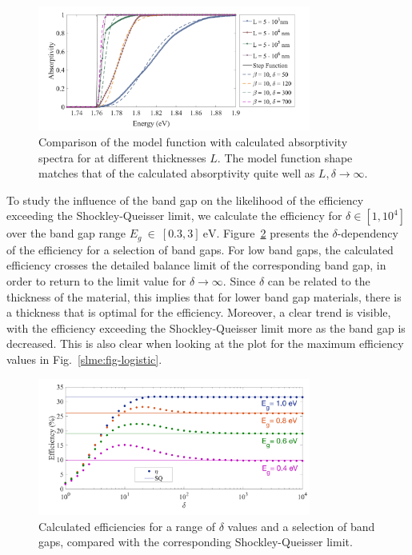 \begin{refsection}
\begin{figure}[ht] 
\centering 
\captionsetup{width=0.9\textwidth}
\includegraphics[width=0.8\textwidth]{Figures/slme/sq_Fig2.png} 
\caption{Comparison of the model function with calculated absorptivity spectra 
for  at different thicknesses $L$. The model function shape 
matches that of the calculated absorptivity quite well as $L,\delta 
\rightarrow \infty$.} 
\label{slme:fig-step} 
\end{figure} 
 
To study the influence of the band gap on the likelihood of the efficiency 
exceeding the Shockley-Queisser limit, we calculate the efficiency for $\delta 
\in [1, 10^4]$ over the band gap range $E_g~\in~[0.3, 3]~\si{\electronvolt}$. 
Figure~\ref{slme:fig-deltadep} presents the $\delta$-dependency of the efficiency for a selection of band gaps. For low band gaps, the 
calculated efficiency crosses the detailed balance limit of the corresponding 
band gap, in order to return to the limit value for $\delta \rightarrow 
\infty$. Since $\delta$ can be related to the thickness of the material, this 
implies that for lower band gap materials, there is a thickness that is 
optimal for the efficiency. Moreover, a clear trend is visible, with the 
efficiency exceeding the Shockley-Queisser limit more as the band gap is 
decreased. This is also clear when looking at the plot for the 
maximum efficiency values in Fig.~\ref{slme:fig-logistic}. 
 
\begin{figure}[ht] 
\centering 
\captionsetup{width=0.9\textwidth}
\includegraphics[width=0.8\textwidth]{Figures/slme/sq_Fig3.png} 
\caption{Calculated efficiencies for a range of $\delta$ values and a 
selection of band gaps, compared with the corresponding Shockley-Queisser 
limit.} 
\label{slme:fig-deltadep} 
\end{figure} 
 

\end{refsection}
